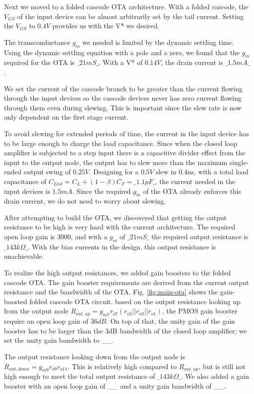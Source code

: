 \documentclass[conference]{IEEEtran}
\begin{document}
Next we moved to a folded cascode OTA architecture. With a folded cascode, the $V_{GS}$ of the input device can be almost arbitrarily set by the tail current. Setting the $V_{GS}$ to $0.4V$ provides us with the V* we desired. 

The transconductance $g_m$ we needed is limited by the dynamic settling time. Using the dynamic settling equation with a pole and a zero, we found that the $g_m$ required for the OTA is $\_21mS\_$. With a V* of $0.14V$, the drain current is $\_1.5mA\_$.

We set the current of the cascode branch to be greater than the current flowing through the input devices so the cascode devices never has zero current flowing through them even during slewing. This is important since the slew rate is now only dependent on the first stage current.

To avoid slewing for extended periods of time, the current in the input device has to be large enough to charge the load capacitance. Since when the closed loop amplifier is subjected to a step input there is a capacitive divider effect from the input to the output node, the output has to slew more than the maximum single-ended output swing of $0.25V$. Designing for a $0.5V$ slew in 0.4ns, with a total load capacitance of $C_{Ltot} = C_L + (1-\beta)C_F = \_1.1pF\_$, the current needed in the input devices is $1.5mA$. Since the required $g_m$ of the OTA already enforces this drain current, we do not need to worry about slewing.

After attempting to build the OTA, we discovered that getting the output resistance to be high is very hard with the current architecture. The required open loop gain is $3000$, and with a $g_m$ of $\_21mS\_$ the required output resistance is $\_143k\Omega\_$. With the bias currents in the design, this output resistance is unachievable.

To realize the high output resistances, we added gain boosters to the folded cascode OTA. The gain booster requirements are derived from the current output resistance and the bandwidth of the OTA. Fig. \ref{fig:main-ota} shows the gain-boosted folded cascode OTA circuit. based on the output resistance looking up from the output node $R_{out, up} = g_{m7}r_{o7}(r_{o5}||r_{o3}||r_{o1})$, the PMOS gain booster require an open loop gain of $36dB$. On top of that, the unity gain of the gain booster has to be larger than the 3dB bandwidth of the closed loop amplifier; we set the unity gain bandwidth to \_\_.

The output resistance looking down from the output node is $R_{out, down} = g_{m9}r_{o9}r_{o11}$. This is relatively high compared to $R_{out, up}$, but is still not high enough to meet the total output resistance of $\_143k\Omega\_$. We also added a gain booster with an open loop gain of \_\_ and a unity gain bandwidth of \_\_.
\end{document}
